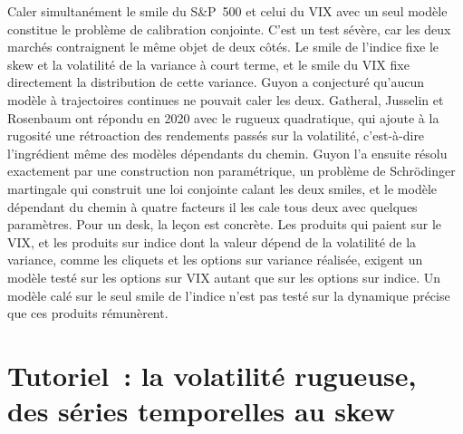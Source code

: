 Caler simultanément le smile du S\&P~500 et celui du VIX avec un seul modèle constitue le problème de calibration conjointe. C'est un test
sévère, car les deux marchés contraignent le même objet de deux côtés. Le smile de l'indice fixe le skew et
la volatilité de la variance à court terme, et le smile du VIX fixe directement la distribution de cette variance.
Guyon a conjecturé qu'aucun modèle à trajectoires continues ne pouvait caler les deux. Gatheral, Jusselin et Rosenbaum
ont répondu en 2020 avec le  rugueux quadratique, qui ajoute à la rugosité une rétroaction des rendements passés sur
la volatilité, c'est-à-dire l'ingrédient même des modèles dépendants du chemin. Guyon l'a ensuite résolu exactement par une construction non paramétrique, un problème de Schrödinger martingale qui
construit une loi conjointe calant les deux smiles, et le modèle dépendant du chemin à quatre facteurs
il les cale tous deux avec quelques paramètres. Pour un desk, la leçon est concrète. Les produits qui paient sur le VIX,
et les produits sur indice dont la valeur dépend de la volatilité de la variance, comme les cliquets et les options sur
variance réalisée, exigent un modèle testé sur les options sur VIX autant que sur les options sur indice. Un modèle calé sur le
seul smile de l'indice n'est pas testé sur la dynamique précise que ces produits rémunèrent.

\section{Tutoriel~: la volatilité rugueuse, des séries temporelles au skew}\label{tut:dv:rough-volatility-and-forward-variance-models:tut}


